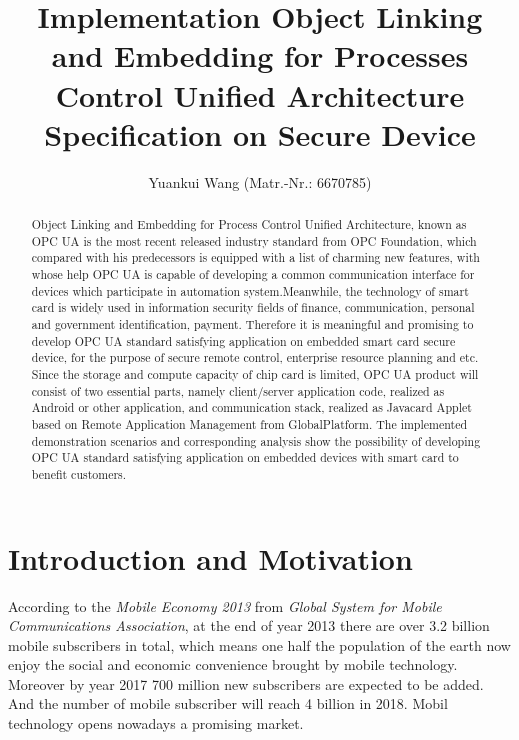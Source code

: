 \documentclass[]{llncs}
\begin{document}
\title{Implementation Object Linking and Embedding for Processes Control Unified Architecture Specification on Secure Device} %
\author{Yuankui Wang (Matr.-Nr.: 6670785)}

\maketitle

\begin{abstract}

Object Linking and Embedding for Process Control Unified Architecture, known as OPC UA is the most recent released industry standard from OPC Foundation, which compared with his predecessors is equipped with a list of charming new features, with whose help OPC UA is capable of developing a common communication interface for devices which participate in automation system.Meanwhile, the technology of smart card is widely used in information security fields of finance, communication, personal and government identification, payment. Therefore it is meaningful and promising to develop OPC UA standard satisfying application on embedded smart card secure device, for the purpose of secure remote control, enterprise resource planning and etc. Since the storage and compute capacity of chip card is limited, OPC UA product will consist of two essential parts, namely client/server application code, realized as Android or other application, and communication stack, realized as Javacard Applet based on Remote Application Management from GlobalPlatform. The implemented demonstration scenarios and corresponding analysis show the possibility of developing OPC UA standard satisfying application on embedded devices with smart card to benefit customers. 
\end{abstract}

\section{Introduction and Motivation}

According to the \emph{Mobile Economy 2013} from \emph{Global System for Mobile Communications Association}, at the end of year 2013 there are over 3.2 billion mobile   subscribers in total, which means one half the population of the earth now enjoy the social and economic convenience brought by mobile technology. Moreover by year 2017 700 million new subscribers are expected to be added. And the number of mobile subscriber will reach 4 billion in 2018. Mobil technology opens nowadays a promising market. 
\end{document}
